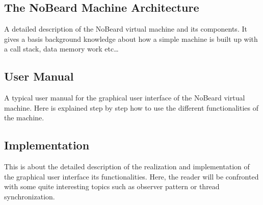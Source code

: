 \subsection{The NoBeard Machine Architecture}
A detailed description of the NoBeard virtual machine and its components. It gives a basis background knowledge about how a simple machine is built up with a call stack, data memory work etc\ldots
\subsection{User Manual}
A typical user manual for the graphical user interface of the NoBeard virtual machine. Here is explained step by step how to use the different functionalities of the machine. 
\subsection{Implementation}
This is about the detailed description of the realization and implementation of the graphical user interface its functionalities. Here, the reader will be confronted with some quite interesting topics such as observer pattern or thread synchronization.
